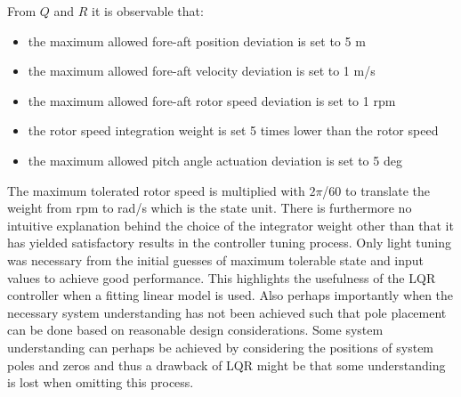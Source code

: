 From $ Q $ and $ R $ it is observable that:
\begin{itemize}
	\item the maximum allowed fore-aft position deviation is set to 5 m
	\item the maximum allowed fore-aft velocity deviation is set to 1 m/s
	\item the maximum allowed fore-aft rotor speed deviation is set to 1 rpm
	\item the rotor speed integration weight is set 5 times lower than the rotor speed
	\item the maximum allowed pitch angle actuation deviation is set to 5 deg
\end{itemize}
The maximum tolerated rotor speed is multiplied with $ 2 \pi $/$ 60 $ to translate the weight from rpm to rad/s which is the state unit. There is furthermore no intuitive explanation behind the choice of the integrator weight other than that it has yielded satisfactory results in the controller tuning process. Only light tuning was necessary from the initial guesses of maximum tolerable state and input values to achieve good performance. This highlights the usefulness of the LQR controller when a fitting linear model is used. Also perhaps importantly when the necessary system understanding has not been achieved such that pole placement can be done based on reasonable design considerations. Some system understanding can perhaps be achieved by considering the positions of system poles and zeros and thus a drawback of LQR might be that some understanding is lost when omitting this process.






